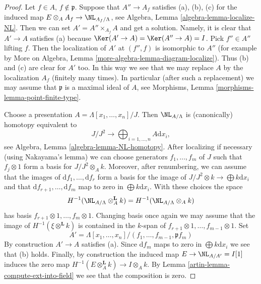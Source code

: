 \begin{proof}

Let $f \in A$, $f \not \in \mathfrak p$. Suppose that $A'' \to A_f$
satisfies (a), (b), (c) for the induced map
$E \otimes_A A_f \to \NL_{A_f/\Lambda}$, see
Algebra, Lemma \ref{algebra-lemma-localize-NL}.
Then we can set $A' = A'' \times_{A_f} A$ and get a solution.
Namely, it is clear that $A' \to A$ satisfies (a) because
$\Ker(A' \to A) = \Ker(A'' \to A) = I$. Pick
$f'' \in A''$ lifting $f$. Then the localization of $A'$ at
$(f'', f)$ is isomorphic to $A''$
(for example by
More on Algebra, Lemma \ref{more-algebra-lemma-diagram-localize}).
Thus (b) and (c) are clear for $A'$ too.
In this way we see that we may replace $A$ by the localization
$A_f$ (finitely many times).
In particular (after such a replacement) we may assume that $\mathfrak p$
is a maximal ideal of $A$, see
Morphisms, Lemma \ref{morphisms-lemma-point-finite-type}.

\medskip\noindent
Choose a presentation $A = \Lambda[x_1, \ldots, x_n]/J$. Then
$\NL_{A/\Lambda}$ is (canonically) homotopy equivalent to
$$
J/J^2
\longrightarrow
\bigoplus\nolimits_{i = 1, \ldots, n} A\text{d}x_i,
$$
see Algebra, Lemma \ref{algebra-lemma-NL-homotopy}. After localizing
if necessary (using Nakayama's lemma) we can choose generators
$f_1, \ldots, f_m$ of $J$ such that $f_j \otimes 1$ form a basis for
$J/J^2 \otimes_A k$. Moreover, after renumbering, we can assume that the
images of $\text{d}f_1, \ldots, \text{d}f_r$ form a
basis for the image of $J/J^2 \otimes k \to \bigoplus k\text{d}x_i$
and that $\text{d}f_{r + 1}, \ldots, \text{d}f_m$ map to zero in
$\bigoplus k\text{d}x_i$. With these choices the space
$$
H^{-1}(\NL_{A/\Lambda} \otimes^{\mathbf{L}}_A k) =
H^{-1}(\NL_{A/\Lambda} \otimes_A k)
$$
has basis $f_{r + 1} \otimes 1, \ldots, f_m \otimes 1$. Changing basis
once again we may assume that the image of $H^{-1}(\xi \otimes^{\mathbf{L}} k)$
is contained in the $k$-span of
$f_{r + 1} \otimes 1, \ldots, f_{m - 1} \otimes 1$.
Set
$$
A' = \Lambda[x_1, \ldots, x_n]/(f_1, \ldots, f_{m - 1}, \mathfrak pf_m)
$$
By construction $A' \to A$ satisfies (a). Since $\text{d}f_m$ maps
to zero in $\bigoplus k\text{d}x_i$ we see that (b) holds. Finally, by
construction the induced map $E \to \NL_{A/A'} = I[1]$ induces the zero map
$H^{-1}(E \otimes_A^\mathbf{L} k) \to I \otimes_A k$. By
Lemma \ref{artin-lemma-compute-ext-into-field}
we see that the composition is zero.
\end{proof}

